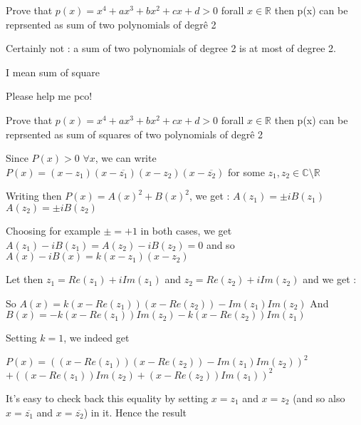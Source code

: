 \begin{solution}
	\begin{tcolorbox}Prove that $p(x)=x^4+ax^3+bx^2+cx+d >0 $ forall $ x \in \mathbb{R}$ then p(x) can be reprsented as sum of two polynomials of degrê 2\end{tcolorbox}
Certainly not : a sum of two polynomials of degree 2 is at most of degree 2.
\end{solution}



\begin{solution}
	I mean sum of square
\end{solution}



\begin{solution}
	Please help me pco!
\end{solution}



\begin{solution}
	\begin{tcolorbox}Prove that $p(x)=x^4+ax^3+bx^2+cx+d >0 $ forall $ x \in \mathbb{R}$ then p(x) can be reprsented as sum of squares of two polynomials of degrê 2\end{tcolorbox}
Since $P(x)>0$ $\forall x$, we can write $P(x)=(x-z_1)(x-\overline{z_1})(x-z_2)(x-\overline{z_2})$ for some $z_1,z_2\in\mathbb  C\setminus\mathbb R$

Writing then $P(x)=A(x)^2+B(x)^2$, we get :
$A(z_1)=\pm iB(z_1)$
$A(z_2)=\pm iB(z_2)$

Choosing for example $\pm=+1$ in both cases, we get $A(z_1)-iB(z_1)=A(z_2)-iB(z_2)=0$ and so $A(x)-iB(x)=k(x-z_1)(x-z_2)$

Let then $z_1=Re(z_1)+i Im(z_1)$ and $z_2=Re(z_2)+i Im(z_2)$ and we get :

So $A(x)=k(x-Re(z_1))(x-Re(z_2))-Im(z_1)Im(z_2)$
And $B(x)=-k(x-Re(z_1))Im(z_2)-k(x-Re(z_2))Im(z_1)$

Setting $k=1$, we indeed get 

$P(x)=((x-Re(z_1))(x-Re(z_2))-Im(z_1)Im(z_2))^2$ $+((x-Re(z_1))Im(z_2)+(x-Re(z_2))Im(z_1))^2$

It's easy to check back this equality by setting $x=z_1$ and $x=z_2$ (and so also $x=\overline{z_1}$ and $x=\overline{z_2}$) in it.
Hence the result
\end{solution}



